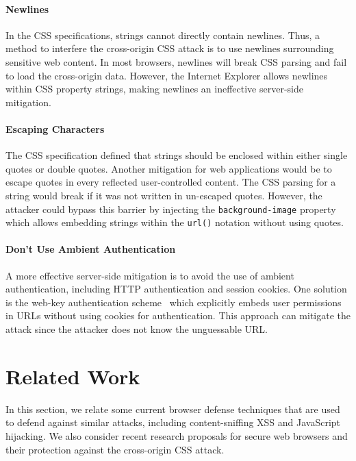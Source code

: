 \documentclass{acm_proc_article-sp}
\begin{document}
\paragraph{Newlines}
In the CSS specifications, strings cannot directly contain newlines. Thus, a method to interfere the cross-origin CSS attack is to use newlines surrounding sensitive web content. In most browsers, newlines will break CSS parsing and fail to load the cross-origin data. However, the Internet Explorer allows newlines within CSS property strings, making newlines an ineffective server-side mitigation.

\paragraph{Escaping Characters}
The CSS specification defined that strings should be enclosed within either single quotes or double quotes. Another mitigation for web applications would be to escape quotes in every reflected user-controlled content. The CSS parsing for a string would break if it was not written in un-escaped quotes. However, the attacker could bypass this barrier by injecting the \texttt{background-image} property which allows embedding strings within the \texttt{url()} notation without using quotes.

\paragraph{Don't Use Ambient Authentication}
A more effective server-side mitigation is to avoid the use of ambient authentication, including HTTP authentication and session cookies. One solution is the web-key authentication scheme~\cite{webkey} which explicitly embeds user permissions in URLs without using cookies for authentication. This approach can mitigate the attack since the attacker does not know the unguessable URL.

\section{Related Work} \label{sec:relatedwork}
In this section, we relate some current browser defense techniques that are used to defend against similar attacks, including content-sniffing XSS and JavaScript hijacking. We also consider recent research proposals for secure web browsers and their protection against the cross-origin CSS attack.
\end{document}
